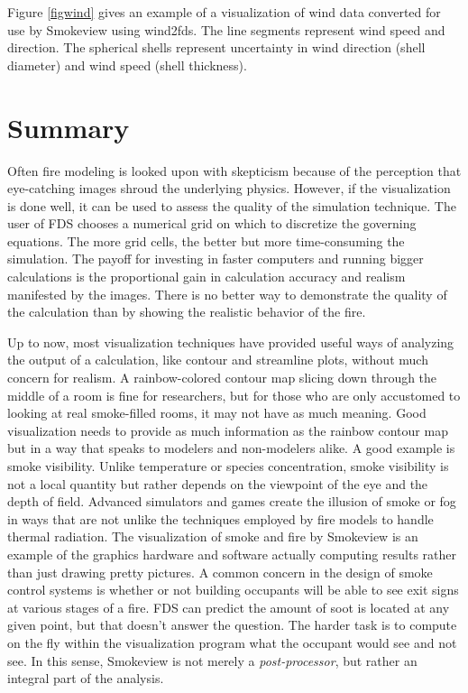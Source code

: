 \documentclass[11pt,twoside]{book}
\begin{document}
Figure \ref{figwind} gives an example of a visualization of wind data converted for use by Smokeview using wind2fds. The line segments represent
 wind speed and direction.  The spherical shells represent uncertainty
 in wind direction (shell diameter) and wind speed (shell thickness).



\chapter{Summary}
Often fire modeling is looked upon with skepticism because of the
perception that eye-catching images shroud the underlying physics.
However, if the visualization is done well, it can be used to
assess the quality of the simulation technique. The user of FDS
chooses a numerical grid on which to discretize the governing
equations. The more grid cells, the better but more time-consuming
the simulation. The payoff for investing in faster computers and
running bigger calculations is the proportional gain in calculation accuracy and realism
manifested by the images. There is no better way to demonstrate
the quality of the calculation than by showing the realistic
behavior of the fire.

Up to now, most visualization techniques have provided useful ways
of analyzing the output of a calculation, like contour and
streamline plots, without much concern for realism. A
rainbow-colored contour map slicing down through the middle of a
room is fine for researchers, but for those who are only
accustomed to looking at real smoke-filled rooms, it may not have
as much meaning. Good visualization needs to provide as much
information as the rainbow contour map but in a way that speaks to
modelers and non-modelers alike. A good example is smoke
visibility. Unlike temperature or species concentration, smoke
visibility is not a local quantity but rather depends on the
viewpoint of the eye and the depth of field. Advanced simulators
and games create the illusion of smoke or fog in ways that are not
unlike the techniques employed by fire models to handle thermal
radiation. The visualization of smoke and fire by Smokeview is an
example of the graphics hardware and software actually computing
results rather than just drawing pretty pictures. A common concern
in the design of smoke control systems is whether or not building
occupants will be able to see exit signs at various stages of a
fire. FDS can predict the amount of soot is located at any given
point, but that doesn't answer the question. The harder task is to
compute on the fly within the visualization program what the
occupant would see and not see. In this sense, Smokeview is not
merely a {\em post-processor}, but rather an integral part of the
analysis.
\end{document}
